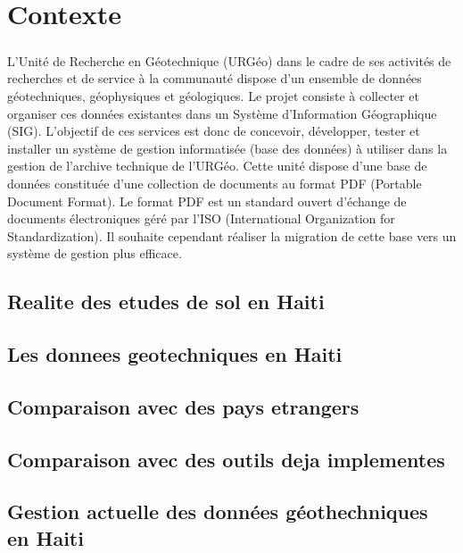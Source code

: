 \chapter*{Contexte}
\paragraph{}
L’Unité de Recherche en Géotechnique (URGéo) dans le cadre de ses activités de recherches et de service à
la communauté dispose d’un ensemble de données géotechniques, géophysiques et géologiques. Le projet
consiste à collecter et organiser ces données existantes dans un Système d’Information Géographique (SIG).
L’objectif de ces services est donc de concevoir, développer, tester et installer un système de gestion
informatisée (base des données) à utiliser dans la gestion de l’archive technique de l’URGéo. Cette unité
dispose d'une base de données constituée d’une collection de documents au format PDF (Portable Document
Format). Le format PDF est un standard ouvert d'échange de documents électroniques géré par l’ISO
(International Organization for Standardization). Il souhaite cependant réaliser la migration de cette base vers
un système de gestion plus efficace.
    \section{Realite des etudes de sol en Haiti}
    \lipsum[1]
    \section{Les donnees geotechniques en Haiti}
    \lipsum[1]
    \section{Comparaison avec des pays etrangers}
    \lipsum[1]
    \section{Comparaison avec des outils deja implementes}
    \lipsum[1]
    \section{Gestion actuelle des données géothechniques en Haiti}
    \lipsum[1]